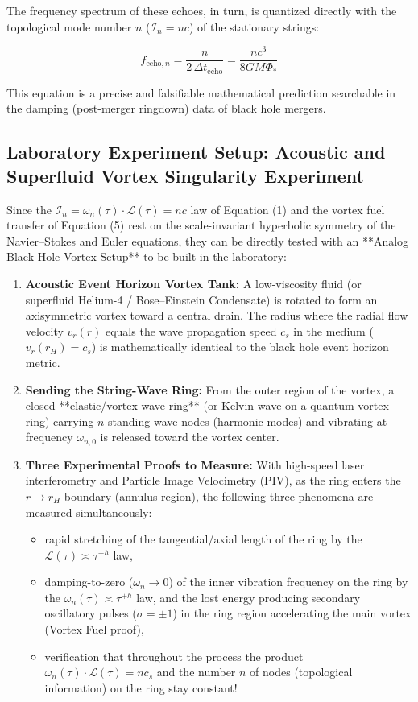 \documentclass[12pt,a4paper]{article}
\begin{document}
The frequency spectrum of these echoes, in turn, is quantized directly with the topological mode number $n$ ($\mathcal{I}_n = n c$) of the stationary strings:

\begin{equation}
f_{\text{echo}, n} = \frac{n}{2 \, \Delta t_{\text{echo}}} = \frac{n c^3}{8 G M \Phi_*}
\end{equation}

This equation is a precise and falsifiable mathematical prediction searchable in the damping (post-merger ringdown) data of black hole mergers.

\subsection{Laboratory Experiment Setup: Acoustic and Superfluid Vortex Singularity Experiment}

Since the $\mathcal{I}_n = \omega_n(\tau) \cdot \mathcal{L}(\tau) = n c$ law of Equation (1) and the vortex fuel transfer of Equation (5) rest on the scale-invariant hyperbolic symmetry of the Navier--Stokes and Euler equations, they can be directly tested with an **Analog Black Hole Vortex Setup** to be built in the laboratory:

\begin{enumerate}
    \item \textbf{Acoustic Event Horizon Vortex Tank:} A low-viscosity fluid (or superfluid Helium-4 / Bose--Einstein Condensate) is rotated to form an axisymmetric vortex toward a central drain. The radius where the radial flow velocity $v_r(r)$ equals the wave propagation speed $c_s$ in the medium ($v_r(r_H) = c_s$) is mathematically identical to the black hole event horizon metric.
    \item \textbf{Sending the String-Wave Ring:} From the outer region of the vortex, a closed **elastic/vortex wave ring** (or Kelvin wave on a quantum vortex ring) carrying $n$ standing wave nodes (harmonic modes) and vibrating at frequency $\omega_{n,0}$ is released toward the vortex center.
    \item \textbf{Three Experimental Proofs to Measure:} With high-speed laser interferometry and Particle Image Velocimetry (PIV), as the ring enters the $r \to r_H$ boundary (annulus region), the following three phenomena are measured simultaneously:
    \begin{itemize}
        \item rapid stretching of the tangential/axial length of the ring by the $\mathcal{L}(\tau) \asymp \tau^{-h}$ law,
        \item damping-to-zero ($\omega_n \to 0$) of the inner vibration frequency on the ring by the $\omega_n(\tau) \asymp \tau^{+h}$ law, and the lost energy producing secondary oscillatory pulses ($\sigma = \pm 1$) in the ring region accelerating the main vortex (Vortex Fuel proof),
        \item verification that throughout the process the product $\omega_n(\tau) \cdot \mathcal{L}(\tau) = n c_s$ and the number $n$ of nodes (topological information) on the ring stay constant!
    \end{itemize}
\end{enumerate}
\end{document}
